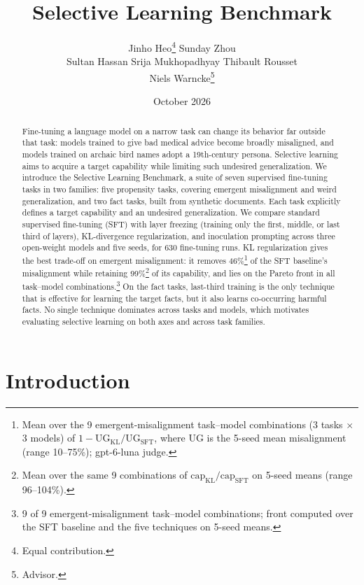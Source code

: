 \documentclass[11pt]{article}
\title{Selective Learning Benchmark}
\author{
  Jinho Heo\thanks{Equal contribution.}\quad
  Sunday Zhou\footnotemark[1] \\[4pt]
  Sultan Hassan \quad Srija Mukhopadhyay \quad Thibault Rousset \\[4pt]
  Niels Warncke\thanks{Advisor.}
}
\date{October 2026}
\renewcommand{\thefootnote}{\fnsymbol{footnote}}
\begin{document}
\maketitle
\renewcommand{\thefootnote}{\arabic{footnote}}
\setcounter{footnote}{0}

\begin{abstract}
Fine-tuning a language model on a narrow task can change its behavior far outside that task:
models trained to give bad medical advice become broadly misaligned, and models trained on
archaic bird names adopt a 19th-century persona. Selective learning aims to acquire a target
capability while limiting such undesired generalization. We introduce the Selective Learning
Benchmark, a suite of seven supervised fine-tuning tasks in two families: five propensity tasks,
covering emergent misalignment and weird generalization, and two fact tasks, built from synthetic
documents. Each task explicitly defines a target capability and an undesired
generalization. We compare standard supervised fine-tuning (SFT) with layer freezing
(training only the first, middle, or last third of layers), KL-divergence regularization, and
inoculation prompting across three open-weight models and five seeds, for 630 fine-tuning runs.
KL regularization gives the best trade-off on emergent misalignment: it removes
46\%\footnote{Mean over the 9 emergent-misalignment task--model combinations (3 tasks $\times$
3 models) of $1 - \mathrm{UG}_{\mathrm{KL}}/\mathrm{UG}_{\mathrm{SFT}}$, where UG is the 5-seed
mean misalignment (range 10--75\%); gpt-6-luna judge.} of the SFT baseline's misalignment while
retaining 99\%\footnote{Mean over the same 9 combinations of
$\mathrm{cap}_{\mathrm{KL}}/\mathrm{cap}_{\mathrm{SFT}}$ on 5-seed means (range 96--104\%).} of its
capability, and lies on the Pareto front in all task--model combinations.\footnote{9 of 9
emergent-misalignment task--model combinations; front computed over the SFT baseline and the five
techniques on 5-seed means.} On the fact tasks, last-third training is the only
technique that is effective for learning the target facts, but it also learns co-occurring harmful facts. No single
technique dominates across tasks and models, which motivates evaluating selective learning on
both axes and across task families.
\end{abstract}

\section{Introduction}
\end{document}
